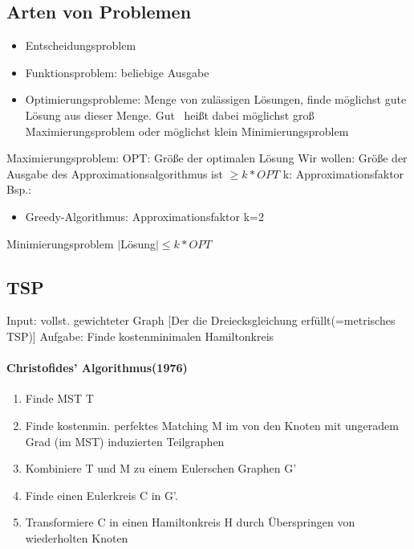 \documentclass[12pt]{article}
\numberwithin{equation}{subsection}
\begin{document}
\subsection{Arten von Problemen}
\begin{itemize}
	\item Entscheidungsproblem
	\item Funktionsproblem: beliebige Ausgabe
	\item Optimierungsprobleme: Menge von zulässigen Lösungen, finde möglichst gute Lösung aus dieser Menge.  \glqq Gut \grqq\ heißt dabei
	\subitem möglichst groß \to Maximierungsproblem
	oder
	\subitem möglichst klein \to Minimierungsproblem
\end{itemize}
Maximierungsproblem:
OPT: Größe der optimalen Lösung 
Wir wollen: Größe der Ausgabe des Approximationsalgorithmus ist $\geq k*OPT$
k: Approximationsfaktor
Bsp.:
\begin{itemize}
	\item Greedy-Algorithmus: Approximationsfaktor k=2
\end{itemize}
Minimierungsproblem
$|$Lösung$|\leq k*OPT$
\subsection{TSP}
Input: vollst. gewichteter Graph [Der die Dreiecksgleichung erfüllt(=metrisches TSP)]
Aufgabe: Finde kostenminimalen Hamiltonkreis
\paragraph{Christofides' Algorithmus(1976)}
\begin{enumerate}
	\item Finde MST T
	\item Finde kostenmin. perfektes Matching M im von den Knoten mit ungeradem Grad (im MST) induzierten Teilgraphen
	\item Kombiniere T und M zu einem Eulerschen Graphen G'
	\item Finde einen Eulerkreis C in G'.
	\item Transformiere C in einen Hamiltonkreis H durch Überspringen von wiederholten Knoten
\end{enumerate}
\end{document}
